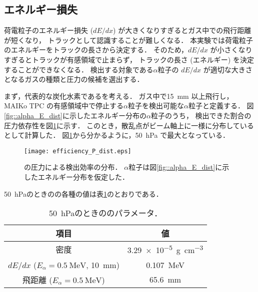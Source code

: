 \documentclass[../master]{subfiles}
\begin{document}
\subsection{エネルギー損失}
荷電粒子のエネルギー損失 ($dE/dx$) が大きくなりすぎるとガス中での飛行距離が短くなり，
トラックとして認識することが難しくなる．
本実験では荷電粒子のエネルギーをトラックの長さから決定する．
そのため，$dE/dx$ が小さくなりすぎるとトラックが有感領域で止まらず，
トラックの長さ (エネルギー) を決定することができなくなる．
検出する対象である$\alpha$粒子の $dE/dx$ が適切な大きさとなるガスの種類と圧力の候補を選出する．

まず，代表的な炭化水素である\Methane を考える．
ガス中で\SI{15}{\milli\metre} 以上飛行し，MAIKo TPC の有感領域中で停止する$\alpha$粒子を検出可能な$\alpha$粒子と定義する．
図\ref{fig::alpha_E_dist}に示したエネルギー分布の$\alpha$粒子のうち，
検出できた割合の圧力依存性を図\ref{fig::efficiency_P_dist}に示す．
このとき，散乱点がビーム軸上に一様に分布しているとして計算した．
図\ref{fig::efficiency_P_dist}から分かるように，\SI{50}{\hecto\pascal} で最大となっている．
\begin{figure}
  \centering
  \texttt{[image: efficiency\_P\_dist.eps]}
  \caption[\Methane の圧力による検出効率の分布．]
          {\Methane の圧力による検出効率の分布．
            $\alpha$粒子は図\ref{fig::alpha_E_dist}に示したエネルギー分布を仮定した．
           }
  \label{fig::efficiency_P_dist}
\end{figure}
\SI{50}{\hecto\pascal}のときの\Methane の各種の値は表\ref{tab::CH4_50_params}のとおりである．
\begin{table}
  \centering
  \caption{\SI{50}{\hecto\pascal}のときの\Methane のパラメータ．}
  \label{tab::CH4_50_params}
  \begin{tabular}{cc}
    \toprule
    項目 & 値\\
    \midrule
    密度 & \SI{3.29e-5}{\gram\per\cubic\centi\metre} \\
    $dE/dx$ ($E_{\alpha} = \SI{0.5}{\mega\electronvolt}$, \SI{10}{\milli\metre}) & \SI{0.107}{\mega\electronvolt}\\
    飛距離 ($E_{\alpha} = \SI{0.5}{\mega\electronvolt}$) & \SI{65.6}{\milli\metre} \\
    \bottomrule
  \end{tabular}
\end{table}
\end{document}
